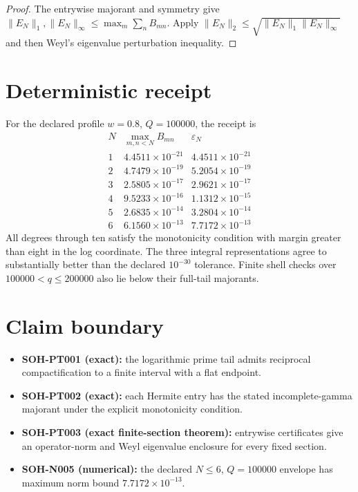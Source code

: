 \begin{proof}
The entrywise majorant and symmetry give
$\|E_N\|_1,\|E_N\|_\infty\le\max_m\sum_nB_{mn}$. Apply
$\|E_N\|_2\le\sqrt{\|E_N\|_1\|E_N\|_\infty}$ and then Weyl's eigenvalue
perturbation inequality.
\end{proof}

\section{Deterministic receipt}

For the declared profile $w=0.8$, $Q=100000$, the receipt is
\[
\begin{array}{c|cc}
N & \max_{m,n<N}B_{mn} & \varepsilon_N\\
\hline
1 & 4.4511\times10^{-21} & 4.4511\times10^{-21}\\
2 & 4.7479\times10^{-19} & 5.2054\times10^{-19}\\
3 & 2.5805\times10^{-17} & 2.9621\times10^{-17}\\
4 & 9.5233\times10^{-16} & 1.1312\times10^{-15}\\
5 & 2.6835\times10^{-14} & 3.2804\times10^{-14}\\
6 & 6.1560\times10^{-13} & 7.7172\times10^{-13}
\end{array}
\]
All degrees through ten satisfy the monotonicity condition with margin greater
than eight in the log coordinate. The three integral representations agree
to substantially better than the declared $10^{-30}$ tolerance. Finite shell
checks over $100000<q\le200000$ also lie below their full-tail majorants.

\section{Claim boundary}

\begin{itemize}
\item \textbf{SOH-PT001 (exact):} the logarithmic prime tail admits reciprocal
compactification to a finite interval with a flat endpoint.
\item \textbf{SOH-PT002 (exact):} each Hermite entry has the stated
incomplete-gamma majorant under the explicit monotonicity condition.
\item \textbf{SOH-PT003 (exact finite-section theorem):} entrywise certificates
give an operator-norm and Weyl eigenvalue enclosure for every fixed section.
\item \textbf{SOH-N005 (numerical):} the declared $N\le6$, $Q=100000$ envelope
has maximum norm bound $7.7172\times10^{-13}$.
\end{itemize}

